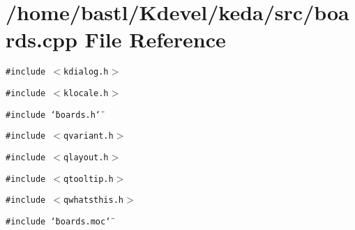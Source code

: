 \section{/home/bastl/Kdevel/keda/src/boards.cpp File Reference}
\label{boards_8cpp}
{\tt \#include $<$kdialog.h$>$}\par
{\tt \#include $<$klocale.h$>$}\par
{\tt \#include \char`\"{}boards.h\char`\"{}}\par
{\tt \#include $<$qvariant.h$>$}\par
{\tt \#include $<$qlayout.h$>$}\par
{\tt \#include $<$qtooltip.h$>$}\par
{\tt \#include $<$qwhatsthis.h$>$}\par
{\tt \#include \char`\"{}boards.moc\char`\"{}}\par
